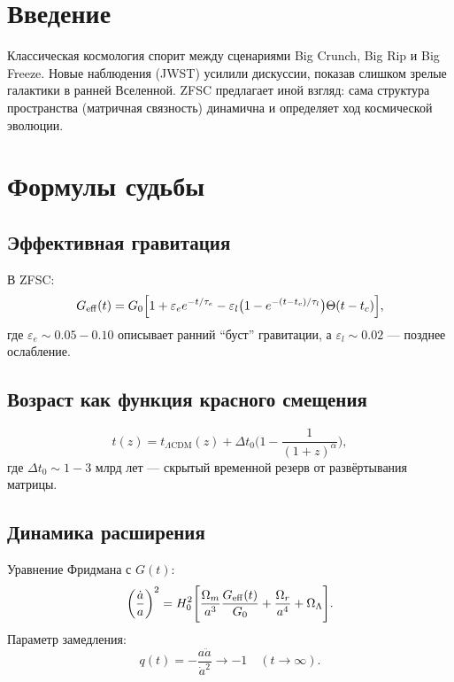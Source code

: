 \documentclass[12pt,a4paper]{article}
\begin{document}
\section{Введение}
Классическая космология спорит между сценариями Big Crunch, Big Rip и Big Freeze. 
Новые наблюдения (JWST) усилили дискуссии, показав слишком зрелые галактики в ранней Вселенной. 
ZFSC предлагает иной взгляд: сама структура пространства (матричная связность) динамична и определяет ход космической эволюции.

\section{Формулы судьбы}
\subsection{Эффективная гравитация}
В ZFSC:
\[
G_{\rm eff}(t) = G_0 \Big[1 + \varepsilon_e e^{-t/\tau_e} - \varepsilon_l \big(1 - e^{-(t-t_c)/\tau_l}\big)\Theta(t-t_c)\Big],
\]
где $\varepsilon_e \sim 0.05-0.10$ описывает ранний ``буст'' гравитации, 
а $\varepsilon_l \sim 0.02$ --- позднее ослабление.

\subsection{Возраст как функция красного смещения}
\[
t(z) = t_{\Lambda \mathrm{CDM}}(z) + \Delta t_0 \Big(1 - \frac{1}{(1+z)^\alpha}\Big), 
\]
где $\Delta t_0 \sim 1-3$ млрд лет --- скрытый временной резерв от развёртывания матрицы.

\subsection{Динамика расширения}
Уравнение Фридмана с $G(t)$:
\[
\left(\frac{\dot a}{a}\right)^2 = H_0^2 \Bigg[ \frac{\Omega_m}{a^3}\frac{G_{\rm eff}(t)}{G_0} + \frac{\Omega_r}{a^4} + \Omega_\Lambda \Bigg].
\]
Параметр замедления:
\[
q(t) = -\frac{a \ddot a}{\dot a^2} \to -1 \quad (t \to \infty).
\]
\end{document}
